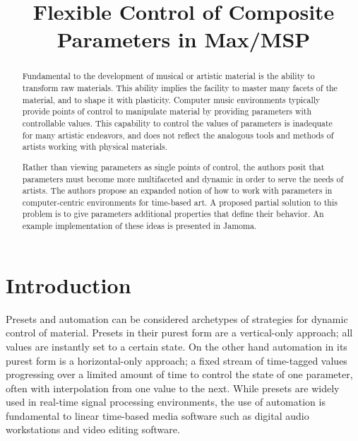 \documentclass{article}
\title{Flexible Control of Composite Parameters in Max/MSP}
\begin{document}
%
\maketitle
%
\sloppy

\begin{abstract}

Fundamental to the development of musical or artistic material is the ability to transform raw materials. This ability implies the facility to master many facets of the material, and to shape it with plasticity. Computer music environments typically provide points of control to manipulate material by providing parameters with controllable values. This capability to control the values of parameters is inadequate for many artistic endeavors, and does not reflect the analogous tools and methods of artists working with physical materials.

Rather than viewing parameters as single points of control, the authors posit that parameters must become more multifaceted and dynamic in order to serve the needs of artists. The authors propose an expanded notion of how to work with parameters in computer-centric environments for time-based art. A proposed partial solution to this problem is to give parameters additional properties that define their behavior. An example implementation of these ideas is presented in Jamoma. 

\end{abstract}


\section{Introduction} %
\label{sec:introduction}

Presets and automation can be considered archetypes of strategies for dynamic control of material. Presets in their purest form are a vertical-only approach; all values are instantly set to a certain state. On the other hand automation in its purest form is a horizontal-only approach; a fixed stream of time-tagged values progressing over a limited amount of time to control the state of one parameter, often with interpolation from one value to the next. While presets are widely used in real-time signal processing environments, the use of automation is fundamental to linear time-based media software such as digital audio workstations and video editing software.
\end{document}

